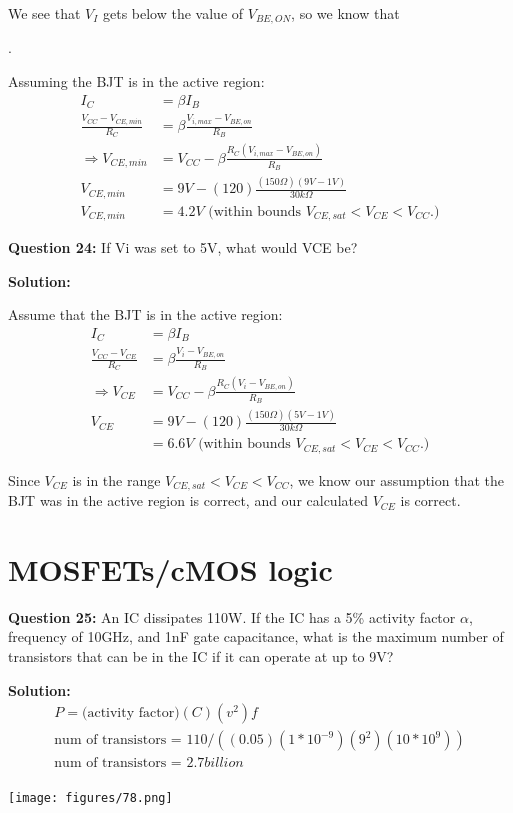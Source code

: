 \documentclass{article}
\begin{document}
We see that $V_I$ gets below the value of $V_{BE,ON}$, so we know that
\begin{center}
    .
\end{center}

Assuming the BJT is in the active region: 
\begin{align*}
    I_C &= \beta I_B \\
    \frac{V_{CC}-V_{CE,min}}{R_C} &= \beta \frac{V_{i,max} - V_{BE,on}}{R_B} \\
    \Rightarrow V_{CE,min} &= V_{CC} - \beta\frac{R_C(V_{i,max} - V_{BE,on})}{R_B} \\
    V_{CE,min} &= 9V - (120)\frac{(150\Omega)(9V-1V)}{30k\Omega} \\
    V_{CE,min}&= \boxed{4.2V} \text{ (within bounds } V_{CE,sat}<V_{CE}< V_{CC}. \text{)}
\end{align*} 

\vspace{5mm}

\textbf{Question 24:} If Vi was set to 5V, what would VCE be?

\textbf{Solution:}

Assume that the BJT is in the active region: 
\begin{align*}
    I_C &= \beta I_B \\
    \frac{V_{CC}-V_{CE}}{R_C} &= \beta \frac{V_i - V_{BE,on}}{R_B} \\
    \Rightarrow V_{CE} &= V_{CC} - \beta\frac{R_C(V_i - V_{BE,on})}{R_B} \\
    V_{CE} &= 9V - (120)\frac{(150\Omega)(5V-1V)}{30k\Omega} \\
    &= \boxed{6.6V} \text{ (within bounds } V_{CE,sat}<V_{CE}< V_{CC}. \text{)}
\end{align*}

Since $V_{CE}$ is in the range $V_{CE,sat} < V_{CE} < V_{CC}$, we know our assumption that the BJT was in the active region is correct, and our calculated $V_{CE}$ is correct.


\section*{MOSFETs/cMOS logic}
\textbf{Question 25:} An IC dissipates 110W. If the IC has a 5\% activity factor \(\alpha\), frequency of 10GHz, and 1nF gate capacitance, what is the maximum number of transistors that can be in the IC if it can operate at up to 9V?

\textbf{Solution:}
\begin{align*}
    P = \text{(activity factor)}(C)(v^{2})f\\
    \text{num of transistors = } 110/((0.05)(1 * 10^{-9})(9^{2})(10*10^{9}))\\
    \text{num of transistors = } \boxed{2.7 billion}\\
\end{align*}
\begin{center}

        \texttt{[image: figures/78.png]}
\end{center}
\end{document}
